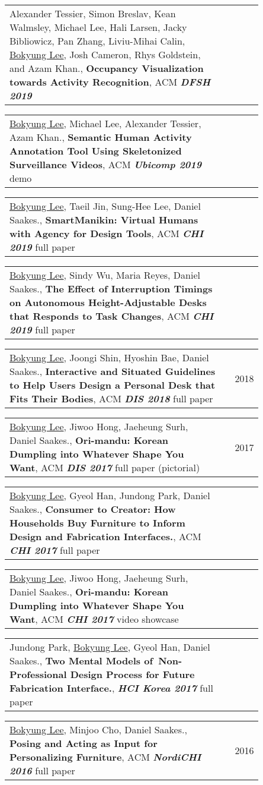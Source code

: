 \documentclass[letterpaper,11pt]{article} %
\makeatletter
\newcommand{\CVPub}[2]{
  \vspace{-2pt}\item
    \begin{tabular*}{0.97\textwidth}[t]{p{0.85\linewidth}@{\extracolsep{\fill}}r}
      \small#1 & #2 \\
    \end{tabular*}\vspace{-7pt}
}
\makeatother
\begin{document}
    \CVPub
      {Alexander Tessier, Simon Breslav, Kean Walmsley, Michael Lee, Hali Larsen, Jacky Bibliowicz, Pan Zhang, Liviu-Mihai Calin, \underline{Bokyung Lee}, Josh Cameron, Rhys Goldstein, and Azam Khan., \textbf{Occupancy Visualization towards Activity Recognition}, ACM \textbf{\textit{DFSH 2019}}}{}
      
    \CVPub
      {\underline{Bokyung Lee}, Michael Lee, Alexander Tessier, Azam Khan., \textbf{Semantic Human Activity Annotation Tool Using Skeletonized Surveillance Videos}, ACM \textbf{\textit{Ubicomp 2019}} demo}{}
      
    \CVPub
      {\underline{Bokyung Lee}, Taeil Jin, Sung-Hee Lee, Daniel Saakes., \textbf{SmartManikin: Virtual Humans with Agency for Design Tools}, ACM \textbf{\textit{CHI 2019}} full paper}{}
      
    \CVPub
      {\underline{Bokyung Lee}, Sindy Wu, Maria Reyes, Daniel Saakes., \textbf{The Effect of Interruption Timings on Autonomous Height-Adjustable Desks that Responds to Task Changes}, ACM \textbf{\textit{CHI 2019}} full paper}{}

    \CVPub
      {\underline{Bokyung Lee}, Joongi Shin, Hyoshin Bae, Daniel Saakes., \textbf{Interactive and Situated Guidelines to Help Users Design a Personal Desk that Fits Their Bodies}, ACM \textbf{\textit{DIS 2018}} full paper}{2018}
      
    \CVPub
      {\underline{Bokyung Lee}, Jiwoo Hong, Jaeheung Surh, Daniel Saakes., \textbf{Ori-mandu: Korean Dumpling into Whatever Shape You Want}, ACM \textbf{\textit{DIS 2017}} full paper (pictorial)}{2017}
      
    \CVPub
      {\underline{Bokyung Lee}, Gyeol Han, Jundong Park, Daniel Saakes., \textbf{Consumer to Creator: How Households Buy Furniture to Inform Design and Fabrication Interfaces.}, ACM \textbf{\textit{CHI 2017}} full paper}{}
      
    \CVPub
      {\underline{Bokyung Lee}, Jiwoo Hong, Jaeheung Surh, Daniel Saakes., \textbf{Ori-mandu: Korean Dumpling into Whatever Shape You Want}, ACM \textbf{\textit{CHI 2017}} video showcase}{}
      
    \CVPub
      {Jundong Park, \underline{Bokyung Lee}, Gyeol Han, Daniel Saakes., \textbf{Two Mental Models of Non-Professional Design Process for Future Fabrication Interface.}, \textbf{\textit{HCI Korea 2017}} full paper}{}
      
    \CVPub
      {\underline{Bokyung Lee}, Minjoo Cho, Daniel Saakes., \textbf{Posing and Acting as Input for Personalizing Furniture}, ACM \textbf{\textit{NordiCHI 2016}} full paper}{2016}
      
\end{document}
